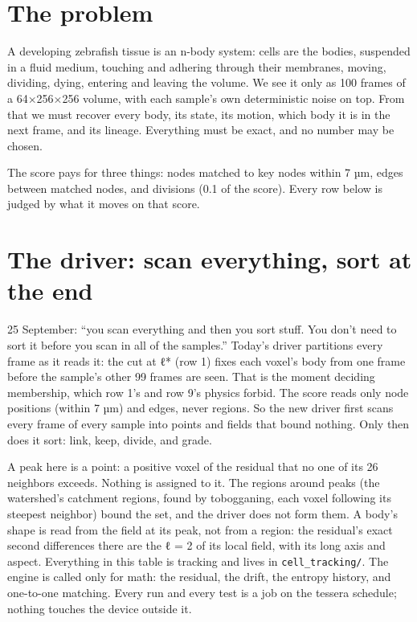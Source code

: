\section{\texorpdfstring{The problem}{The problem}}

A developing zebrafish tissue is an n-body system: cells are the bodies, suspended in a fluid medium, touching and adhering through their membranes, moving, dividing, dying, entering and leaving the volume. We see it only as 100 frames of a 64×256×256 volume, with each sample's own deterministic noise on top. From that we must recover every body, its state, its motion, which body it is in the next frame, and its lineage. Everything must be exact, and no number may be chosen.

The score pays for three things: nodes matched to key nodes within 7 µm, edges between matched nodes, and divisions (0.1 of the score). Every row below is judged by what it moves on that score.

\section{\texorpdfstring{The driver: scan everything, sort at the end}{The driver: scan everything, sort at the end}}

25 September: “you scan everything and then you sort stuff. You don't need to sort it before you scan in all of the samples.” Today's driver partitions every frame as it reads it: the cut at ℓ* (row 1) fixes each voxel's body from one frame before the sample's other 99 frames are seen. That is the moment deciding membership, which row 1's and row 9's physics forbid. The score reads only node positions (within 7 µm) and edges, never regions. So the new driver first scans every frame of every sample into points and fields that bound nothing. Only then does it sort: link, keep, divide, and grade.

A peak here is a point: a positive voxel of the residual that no one of its 26 neighbors exceeds. Nothing is assigned to it. The regions around peaks (the watershed's catchment regions, found by tobogganing, each voxel following its steepest neighbor) bound the set, and the driver does not form them. A body's shape is read from the field at its peak, not from a region: the residual's exact second differences there are the ℓ = 2 of its local field, with its long axis and aspect. Everything in this table is tracking and lives in \texttt{cell\_\allowbreak{}tracking/\allowbreak{}}. The engine is called only for math: the residual, the drift, the entropy history, and one-to-one matching. Every run and every test is a job on the tessera schedule; nothing touches the device outside it.

